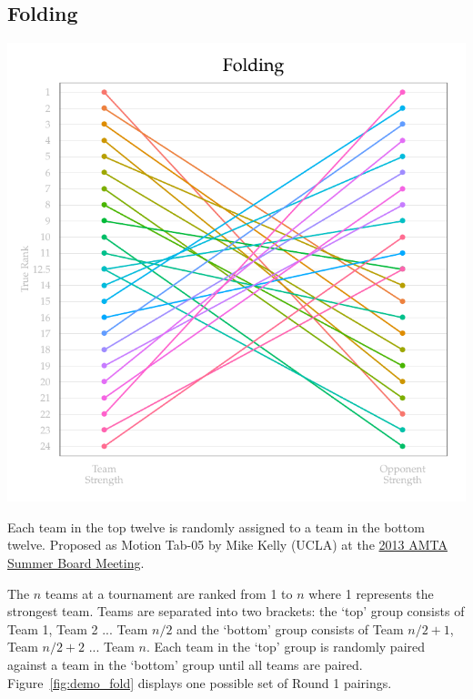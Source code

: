 \documentclass{tufte-handout}
\begin{document}
\subsection{Folding}
\begin{marginfigure}%
  \includegraphics[width=\linewidth]{folding_demo.pdf}
  \caption{Each team in the top twelve is randomly assigned to a team in the bottom twelve. Proposed as Motion Tab-05 by Mike Kelly (UCLA) at the \href{http://www.collegemocktrial.org/2013AMTAagendafinal.pdf}{2013 AMTA Summer Board Meeting}.}
  \label{fig:demo_fold}
\end{marginfigure}

The $n$ teams at a tournament are ranked from 1 to $n$ where 1 represents the strongest team. Teams are separated into two brackets: the `top' group consists of Team 1, Team 2 ...  Team $n/2$ and the `bottom' group consists of Team $n/2 + 1$, Team $n/2 + 2$ ... Team $n$. Each team in the `top' group is randomly paired against a team in the `bottom' group until all teams are paired. Figure~\ref{fig:demo_fold} displays one possible set of Round 1 pairings.
\end{document}
